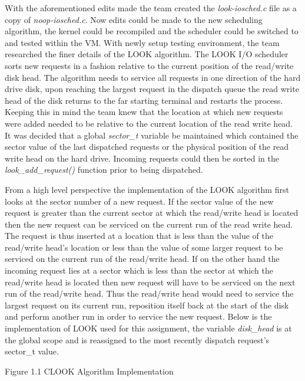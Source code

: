 \documentclass[10pt,onecolumn,draftclsnofoot]{IEEEtran} %
\begin{document}
\begin{singlespace}
        \normalfont \indent With the aforementioned edits made the team created the \textit{look-iosched.c} file as a copy of \textit{noop-iosched.c}. Now edits could be made to the new scheduling algorithm, the kernel could be recompiled and the scheduler could be switched to and tested within the VM. With newly setup testing environment, the team researched the finer details of the LOOK algorithm. The LOOK I/O scheduler sorts new requests in a fashion relative to the current position of the read/write disk head. The algorithm needs to service all requests in one direction of the hard drive disk, upon reaching the largest request in the dispatch queue the read write head of the disk returns to the far starting terminal and restarts the process. Keeping this in mind the team knew that the location at which new requests were added needed to be relative to the current location of the read write head. It was decided that a global \textit{sector\_t} variable be maintained which contained the sector value of the last dispatched requests or the physical position of the read write head on the hard drive. Incoming requests could then be sorted in the \textit{look\_add\_request()} function prior to being dispatched.

        \normalfont \indent From a high level perspective the implementation of the LOOK algorithm first looks at the sector number of a new request. If the sector value of the new request is greater than the current sector at which the read/write head is located then the new request can be serviced on the current run of the read write head. The request is thus inserted at a location that is less than the value of the read/write head's location or less than the value of some larger request to be serviced on the current run of the read/write head. If on the other hand the incoming request lies at a sector which is less than the sector at which the read/write head is located then new request will have to be serviced on the next run of the read/write head. Thus the read/write head would need to service the largest request on its current run, reposition itself back at the start of the disk and perform another run in order to service the new request. Below is the implementation of LOOK used for this assignment, the variable \textit{disk\_head} is at the global scope and is reassigned to the most recently dispatch request's sector\_t value.

\newpage

\begin{center}
Figure 1.1 CLOOK Algorithm Implementation
\end{center}


\end{singlespace}
\end{document}
